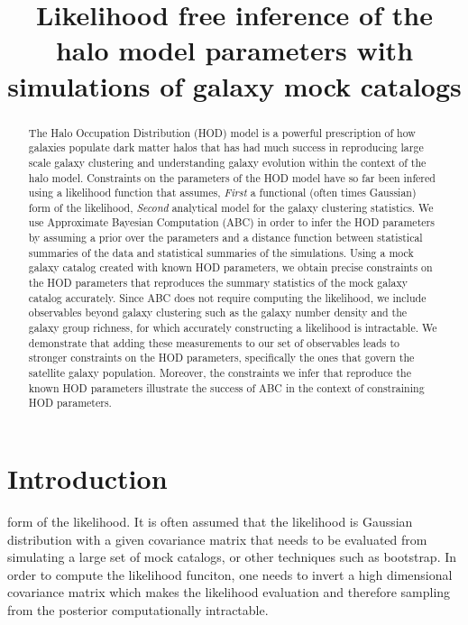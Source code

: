 \documentclass[12pt, preprint]{aastex}
\begin{document}
\title{Likelihood free inference of the halo model parameters with simulations of galaxy mock catalogs}

\begin{abstract}

The Halo Occupation Distribution (HOD) model is a powerful prescription of how galaxies populate 
dark matter halos that has had much success in reproducing large scale galaxy clustering and understanding
galaxy evolution within the context of the halo model. Constraints on the parameters of the HOD model have 
so far been infered using a likelihood function that assumes, \emph{First} a functional (often times Gaussian) form of the likelihood, 
\emph{Second} analytical model for the galaxy clustering statistics. We use Approximate Bayesian Computation (ABC) 
in order to infer the HOD parameters by assuming a prior over the parameters and a distance function between 
statistical summaries of the data and statistical summaries of the simulations.
Using a mock galaxy catalog created with known HOD parameters, we obtain precise constraints on the HOD parameters that 
reproduces the summary statistics of the mock galaxy catalog accurately. 
Since ABC does not require computing the likelihood, we include observables beyond galaxy clustering such as 
the galaxy number density and the galaxy group richness, for which accurately constructing a likelihood is intractable. 
We demonstrate that adding these measurements to our set of observables leads to stronger constraints on the HOD parameters, 
specifically the ones that govern the satellite galaxy population. Moreover, the constraints we infer that 
reproduce the known HOD parameters illustrate the success of ABC in the context of constraining HOD parameters. 

\end{abstract}

\section{Introduction}

form of the likelihood. It is often assumed that the likelihood is Gaussian distribution 
with a given covariance matrix that needs to be evaluated from simulating a large set of 
mock catalogs, or other techniques such as bootstrap. In order to 
compute the likelihood funciton, one needs to invert a high dimensional covariance 
matrix which makes the likelihood evaluation and therefore sampling from the posterior 
computationally intractable.
\end{document}
